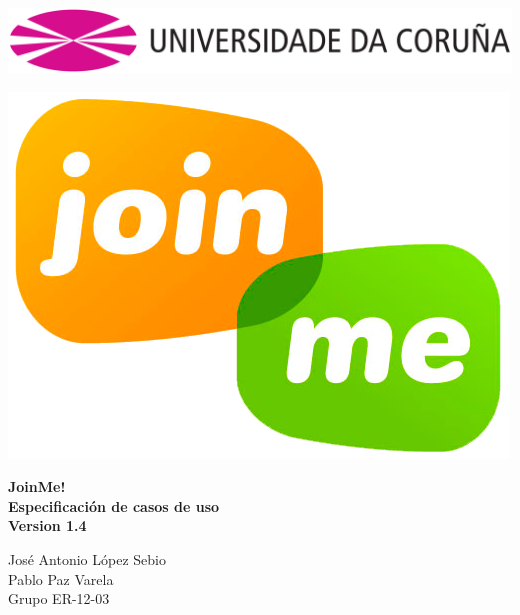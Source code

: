 \documentclass[12pt, a4paper, titlepage]{article}
\begin{document}

\begin{titlepage}

\includegraphics[width=15cm]{Imagenes/Simbolo_logo_UDC.png}

\vspace{3cm}

\begin{center}
\includegraphics[scale=0.3]{Imagenes/1a_Practica_ER_14-15.png}
\end{center}

\begin{flushright}
	\LARGE{\textbf{ JoinMe!}}\\
	\LARGE{\textbf{Especificación de casos de uso}}\\
	\large{\textbf{Version 1.4}}
	
		
\end{flushright}
\vspace{1cm}
\begin{center}
José Antonio López Sebio\\
Pablo Paz Varela\\
Grupo ER-12-03\\
\end{center}


\end{titlepage}
\end{document}
